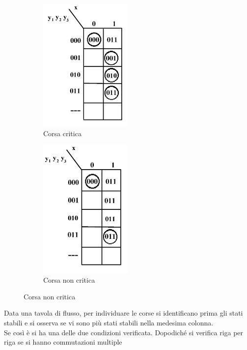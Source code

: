 \documentclass[a4paper]{extarticle}
\begin{document}
\noindent
\begin{figure}[H]
    \begin{subfigure}{0.5\textwidth}
        \centering
        \includegraphics[width=0.5\textwidth]{corsa-critica.png}
        \caption{Corsa critica}
        \label{fig:corsa_critica}
    \end{subfigure}
    \begin{subfigure}{0.5\textwidth}
        \centering
        \includegraphics[width=0.5\textwidth]{corsa-non-critica.png}
        \caption{Corsa non critica}
        \label{fig:corsa_non_critica}
    \end{subfigure}
\end{figure}

\vspace{1em}
\noindent
Data una tavola di flusso, per individuare le corse si identificano prima gli stati stabili e si osserva se vi sono più stati stabili nella medesima colonna.\\
Se così è si ha una delle due condizioni verificata. Dopodiché si verifica riga per riga se si hanno commutazioni multiple
\end{document}
